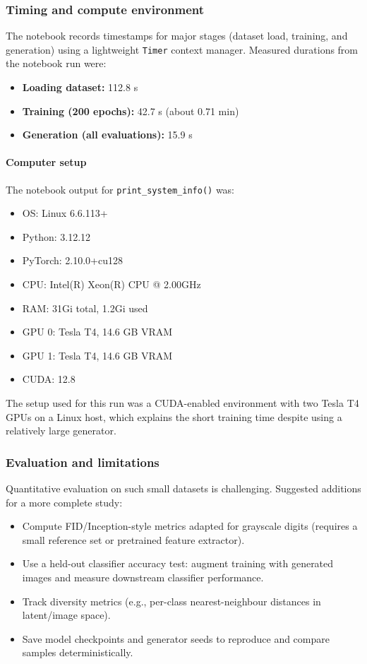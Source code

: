 \subsubsection*{Timing and compute environment}
The notebook records timestamps for major stages (dataset load, training, and generation) using a lightweight \texttt{Timer} context manager. Measured durations from the notebook run were:
\begin{itemize}
	\item \textbf{Loading dataset:} 112.8 s
	\item \textbf{Training (200 epochs):} 42.7 s (about 0.71 min)
	\item \textbf{Generation (all evaluations):} 15.9 s
\end{itemize}

\paragraph{Computer setup}
The notebook output for \verb|print_system_info()| was:
\begin{itemize}
\item OS: Linux 6.6.113+
\item Python: 3.12.12
\item PyTorch: 2.10.0+cu128
\item CPU: Intel(R) Xeon(R) CPU @ 2.00GHz
\item RAM: 31Gi total, 1.2Gi used
\item GPU 0: Tesla T4, 14.6 GB VRAM
\item GPU 1: Tesla T4, 14.6 GB VRAM
\item CUDA: 12.8
\end{itemize}

The setup used for this run was a CUDA-enabled environment with two Tesla T4 GPUs on a Linux host, which explains the short training time despite using a relatively large generator.

\subsubsection*{Evaluation and limitations}
Quantitative evaluation on such small datasets is challenging. Suggested additions for a more complete study:
\begin{itemize}
	\item Compute FID/Inception-style metrics adapted for grayscale digits (requires a small reference set or pretrained feature extractor).
	\item Use a held-out classifier accuracy test: augment training with generated images and measure downstream classifier performance.
	\item Track diversity metrics (e.g., per-class nearest-neighbour distances in latent/image space).
	\item Save model checkpoints and generator seeds to reproduce and compare samples deterministically.
\end{itemize}

